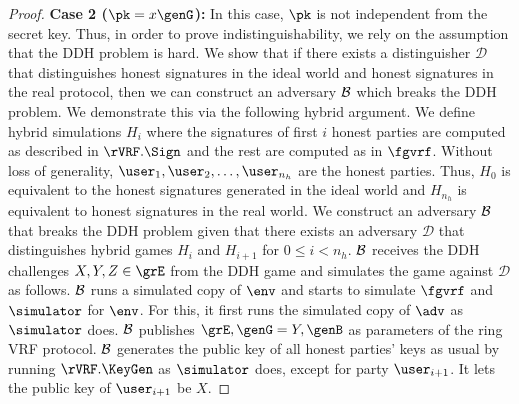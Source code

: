 \begin{proof}
	\textbf{Case 2 ($ \pk = x \genG$):} In this case, $ \pk $ is not independent from the secret key. Thus, in order to prove indistinguishability, we rely on the assumption that the DDH problem  is hard.  We show that if there exists a distinguisher $ \mathcal{D} $ that distinguishes honest signatures in the ideal world and honest signatures in the real protocol, then we can construct an adversary $ \mathcal{B} $ which breaks the DDH problem. 
	We demonstrate this via the following hybrid argument.
	We define hybrid simulations $ H_{i} $ where  the signatures of first $ i $ honest parties are computed as described in $ \rVRF.\Sign $ and the rest are computed as in $ \fgvrf $. Without loss of generality, $ \user_1, \user_2, \ldots, \user_{n_h} $ are the honest parties. Thus, $ H_0 $ is equivalent to the honest signatures generated in the ideal world  and $ H_{n_h}  $ is equivalent to  honest signatures in the real world.  We construct an adversary $ \mathcal{B} $ that breaks the DDH problem given that there exists an adversary $ \mathcal{D} $ that distinguishes hybrid games $ H_i $ and $ H_{i + 1} $ for $ 0 \leq i < n_h $. $\mathcal{B} $ receives the DDH challenges $ X,Y, Z \in \GG $ from the DDH game and simulates the game against $ \mathcal{D} $ as follows. 
	$ \mathcal{B} $ runs a simulated copy of $ \env $ and starts to simulate $ \fgvrf $ and $ \simulator $ for $ \env $. For this, it first runs the simulated copy of $ \adv $ as $ \simulator $ does. $  \mathcal{B} $ publishes $ \GG, \genG = Y, \genB $ as parameters of the ring VRF protocol. $\mathcal{B} $ generates the public key of all  honest parties' keys as usual by running $ \rVRF.\KeyGen$ as $ \simulator $ does, except for party $ \user_{i+1} $. It lets the public key of $ \user_{i + 1} $ be $ X $.
	
	

\end{proof}
